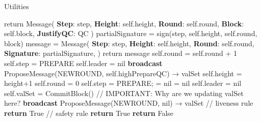 \documentclass[a4paper]{article}
\begin{document}
\begin{algorithm}
\caption{Utilities}
    \begin{algorithmic}[1]
        \State return  {Message}(
          \State \indent \textbf{Step}: step,
          \State \indent \textbf{Height}: self.height,
          \State \indent \textbf{Round}: self.round,
          \State \indent \textbf{Block}: self.block,
          \State \indent \textbf{JustifyQC}: QC
          \State )
      \EndFunction
      \vspace {5 mm}
        \State partialSignature = sign(step, self.height, self.round, block)
        \State message = {Message}(
          \State \indent \textbf{Step}: step,
          \State \indent \textbf{Height}: self.height,
          \State \indent \textbf{Round}: self.round,
          \State \indent \textbf{Signature}: partialSignature,
          \State )
        \State return message
      \EndFunction
      \vspace {5 mm}
        \State self.round = self.round + 1
        \State self.step = PREPARE
        \State self.leader = nil
        \State \textbf{broadcast} ProposeMessage(NEWROUND, self.highPrepareQC) → valSet
      \EndFunction
      \vspace {5 mm}
        \State self.height = height+1
        \State self.round = 0
        \State self.step = PREPARE;
         = nil
         = nil
        \State self.leader = nil
        \State self.valSet = CommitBlock() {\color{Red} // IMPORTANT: Why are we updating valSet here?}
        \State \textbf{broadcast} ProposeMessage(NEWROUND, nil) → valSet
      \EndFunction
      \vspace{5 mm}
             {\color{Gray} { // liveness rule}}
             \State \textbf{return} True
           \Else
              {\color{Gray} { // safety rule}}
                \State\textbf{return} True
             \EndIf
           \EndIf
         \EndIf
         \State \textbf{return} False
       \EndFunction
    \end{algorithmic}
\end{algorithm}
\end{document}
